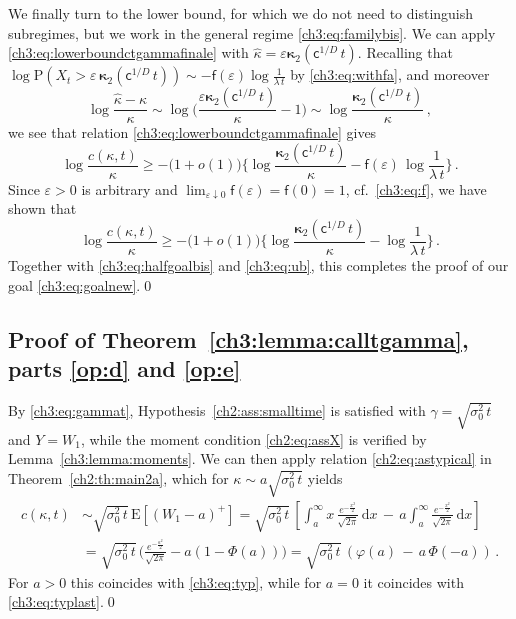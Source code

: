\documentclass[a4paper,reqno,11pt]{amsart}
\numberwithin{equation}{section}
\newcommand{\dd}{\text{\rm d}}             %
\newcommand{\PEfont}{\mathrm}
\renewcommand{\P}{\ensuremath{\PEfont P}}
\newcommand{\E}{\ensuremath{\PEfont E}}
\renewcommand{\epsilon}{\varepsilon}
\renewcommand{\phi}{\varphi}
\newcommand\sfc{\mathsf{c}}
\newcommand\sff{\mathsf{f}}
\def\dd{\mathrm{d}}
\newcommand\bkappa{\boldsymbol{\kappa}}
\begin{document}
\smallskip

We finally turn to the lower bound,
for which we do not need to distinguish subregimes,
but we work in the general regime \eqref{ch3:eq:familybis}.
We can apply \eqref{ch3:eq:lowerboundctgammafinale}
with $\hat\kappa = \epsilon\bkappa_2(\sfc^{1/D} \, t)$.
Recalling that $\log \P(X_t > \epsilon \, \bkappa_2(\sfc^{1/D} \, t)) 
\sim -\sff(\epsilon) \log\frac{1}{ \lambda \, t}$
by \eqref{ch3:eq:withfa}, and moreover
\begin{equation*}
	\log \frac{\hat\kappa - \kappa}{\kappa} \sim
	\log \bigg( \frac{\epsilon \bkappa_2( \sfc^{1/D} \, t)}{\kappa} - 1 \bigg) \sim
	\log \frac{\bkappa_2(\sfc^{1/D} \, t)}{\kappa} \,,
\end{equation*}
we see that relation \eqref{ch3:eq:lowerboundctgammafinale} gives
\begin{equation} \label{ch3:eq:lbuff2}
 \log \frac{c(\kappa,t)}{\kappa}
	\ge -\big(1+o(1)\big) 
	\bigg\{ \log \frac{\bkappa_2(\sfc^{1/D} \, t)}{\kappa}
	- \sff(\epsilon) \, \log \frac{1}{\lambda \, t} \bigg\} \,.
\end{equation}
Since $\epsilon > 0$ is arbitrary and $\lim_{\epsilon \downarrow 0} \sff(\epsilon)
= \sff(0) = 1$, cf.\ \eqref{ch3:eq:f}, we have shown that
\begin{equation*}
	 \log \frac{c(\kappa,t)}{\kappa}
	\ge -\big(1+o(1)\big) \bigg\{ \log \frac{\bkappa_2(\sfc^{1/D} \, t)}{\kappa}
	- \log \frac{1}{\lambda \, t} \bigg\} \,.
\end{equation*}
Together with \eqref{ch3:eq:halfgoalbis} and \eqref{ch3:eq:ub},
this completes the proof of our goal \eqref{ch3:eq:goalnew}.\qed


\subsection{Proof of  Theorem~\ref{ch3:lemma:calltgamma}, parts \eqref{op:d} and \eqref{op:e}}
\label{ch3:sec:callesigmat05}

By \eqref{ch3:eq:gammat}, Hypothesis~\ref{ch2:ass:smalltime} is satisfied
with $\gamma = \sqrt{\sigma_0^2 \, t}$ and $Y = W_1$, while the moment condition 
\eqref{ch2:eq:assX} is verified 
by Lemma~\ref{ch3:lemma:moments}.
We can then apply relation \eqref{ch2:eq:astypical} in Theorem~\ref{ch2:th:main2a}, 
which for $\kappa \sim a \sqrt{\sigma_0^2 \, t}$ yields
\begin{equation*}
 \begin{split}
c(\kappa,t) &\sim \sqrt{\sigma_0^2 \, t}
\, \E\left[\left(W_1- a\right)^+\right]
=\sqrt{\sigma_0^2 \, t} \, \left[\int_{ a}^{\infty}
x \, \frac{e^{-\frac{x^2}{2}}}{\sqrt{2\pi}} \, \dd x
\,-\,  a \int_{ a}^{\infty} 
\frac{e^{-\frac{x^2}{2}}}{\sqrt{2\pi}} \, \dd x \right]\\
&=\sqrt{\sigma_0^2 \, t}\,
\Bigg(\frac{e^{-\frac{a^2}{2}}}{\sqrt{2\pi}}-
 a \left(1-\Phi\left( a\right)\right)\Bigg)
=\sqrt{\sigma_0^2 \, t}\, \left(\phi\left( a\right) \,-\,
 a \, \Phi\left(- a\right)\right) \,.
 \end{split}
\end{equation*}
For $a > 0$ this coincides with \eqref{ch3:eq:typ}, while for $a=0$
it coincides with \eqref{ch3:eq:typlast}.\qed
\end{document}

